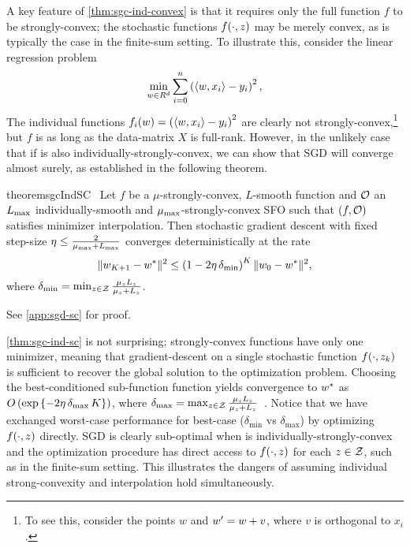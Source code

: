 A key feature of \autoref{thm:sgc-ind-convex} is that it requires only the full function \( f \) to be strongly-convex; the stochastic functions \( f(\cdot, \z) \) may be merely convex, as is typically the case in the finite-sum setting.
To illustrate this, consider the linear regression problem
\[ \min_{\w \in R^d} \sum_{i=0}^n \rbr{\abr{\w, x_i} - y_i}^2, \]
The individual functions \( f_i(\w) = \rbr{\abr{\w, x_i} - y_i}^2 \) are clearly not strongly-convex,\footnote{To see this, consider the points \(w\) and \( \w' = \w + v \), where \( v \) is orthogonal to \( x_i \).} but \( f \) is as long as the data-matrix \( X \) is full-rank. 
However, in the unlikely case that if \oracle{} is also individually-strongly-convex, we can show that \ac{SGD} will converge almost surely, as established in the following theorem.

\begin{restatable}{theorem}{sgcIndSC}~\label{thm:sgc-ind-sc}
    Let \( f \) be a \( \mu \)-strongly-convex, \( L \)-smooth function and \( \oracle{} \) an \( \Lmax \) individually-smooth and \( \mumax \)-strongly-convex \ac{SFO} such that \( \rbr{f, \oracle{}} \) satisfies minimizer interpolation. 
    Then stochastic gradient descent with fixed step-size \( \eta \leq \frac{2}{\mumax + \Lmax} \) converges deterministically at the rate 
    \[ \norm{\w_{K+1} - \wopt}^2 \leq \rbr{1 - 2 \eta \, \delta_{\text{min}} }^K \norm{\w_0 - \wopt}^2, \] 
    where \( \delta_{\text{min}} = \min_{\z \in \calZ} \frac{\mu_\z L_\z}{\mu_\z + L_\z} \).
\end{restatable}%
\noindent See \autoref{app:sgd-sc} for proof.\hfill \break

\autoref{thm:sgc-ind-sc} is not surprising; strongly-convex functions have only one minimizer, meaning that gradient-descent on a single stochastic function \( f(\cdot, \zk) \) is sufficient to recover the global solution to the optimization problem.
Choosing the best-conditioned sub-function function yields convergence to \( \wopt \) as \( O\rbr{\exp\cbr{ - 2 \eta \, \delta_{\text{max}} \, K}} \), where \( \delta_{\text{max}} = \max_{\z \in \calZ} \frac{\mu_z L_\z}{\mu_z + L_\z} \)~\citep{bubeck2015convex}.
Notice that we have exchanged worst-case performance for best-case (\( \delta_{\text{min}} \) vs \( \delta_{\text{max}} \)) by optimizing \( f(\cdot, \z) \) directly.
\ac{SGD} is clearly sub-optimal when \oracle{} is individually-strongly-convex and the optimization procedure has direct access to \( f(\cdot, \z ) \) for each \( \z \in \calZ \), such as in the finite-sum setting. 
This illustrates the dangers of assuming individual strong-convexity and interpolation hold simultaneously.

